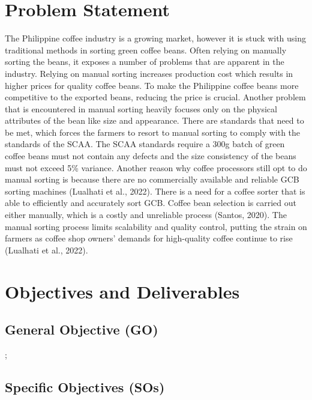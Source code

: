 \section{Problem Statement}
The Philippine coffee industry is a growing market, however it is stuck with using traditional methods in sorting green coffee beans. Often relying on manually sorting the beans, it exposes a number of problems that are apparent in the industry. Relying on manual sorting increases production cost which results in higher prices for quality coffee beans. To make the Philippine coffee beans more competitive to the exported beans, reducing the price is crucial. Another problem that is encountered in manual sorting heavily focuses only on the physical attributes of the bean like size and appearance. There are standards that need to be met, which forces the farmers to resort to manual sorting to comply with the standards of the SCAA. The SCAA standards require a 300g batch of green coffee beans must not contain any defects and the size consistency of the beans must not exceed 5\% variance. Another reason why coffee processors still opt to do manual sorting is because there are no commercially available and reliable GCB sorting machines (Lualhati et al., 2022). There is a need for a coffee sorter that is able to efficiently and accurately sort GCB. Coffee bean selection is carried out either manually, which is a costly and unreliable process (Santos, 2020). The manual sorting process limits scalability and quality control, putting the strain on farmers as coffee shop owners' demands for high-quality coffee continue to rise (Lualhati et al., 2022).   	 	 

\section{Objectives and Deliverables}

\subsection{General Objective (GO)}
 ;

\subsection{Specific Objectives (SOs)}


